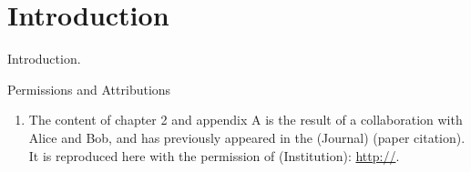 \documentclass[oneside,12pt,final]{sty/ucthesis-CA2012}
\begin{document}
\begin{frontmatter}
	
	\maketitle
	\approvalpage
	\copyrightpage
	
	
	
	\tableofcontents
\end{frontmatter}

\begin{mainmatter}

\pagestyle{fancy}
\renewcommand{\chaptermark}[1]{\markboth{{\sf #1 \hspace*{\fill} Chapter~\thechapter}}{} }
\renewcommand{\sectionmark}[1]{\markright{ {\sf Section~\thesection \hspace*{\fill} #1 }}}
\fancyhf{}

\makeatletter \if@twoside \fancyhead[LO]{\small \rightmark} \fancyhead[RE]{\small\leftmark} \else \fancyhead[LO]{\small\leftmark}
\fancyhead[RE]{\small\rightmark} \fi

\def\cleardoublepage{\clearpage\if@openright \ifodd\c@page\else
  \hbox{}
  \vspace*{\fill}
  \begin{center}
    This page intentionally left blank
  \end{center}
  \vspace{\fill}
  \thispagestyle{plain}
  \newpage
  \fi \fi}
\makeatother
\fancyfoot[c]{\textrm{\textup{\thepage}}} %
\fancyfoot[C]{\thepage}
\renewcommand{\headrulewidth}{0.4pt}

 { \fancyhf{} \fancyfoot[C]{\thepage}
\renewcommand{\headrulewidth}{0pt}
\renewcommand{\footrulewidth}{0pt}}

\chapter{Introduction}

Introduction.

\begin{section}{Permissions and Attributions}
\begin{enumerate}

\item The content of chapter 2 and appendix A is the result of a collaboration with Alice and Bob, and has previously appeared in the (Journal) (paper citation). It is reproduced here with the permission of (Institution): \url{http://}.


\end{enumerate}
\end{section}
\end{mainmatter}
\end{document}
